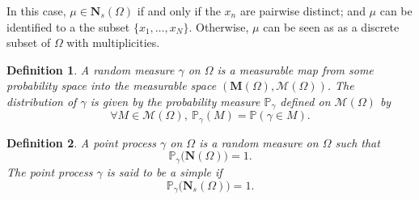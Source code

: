 \documentclass[twoside,11pt]{book}
\newtheorem{definition}{Definition}
\numberwithin{theorem}{chapter}
\numberwithin{definition}{chapter}
\numberwithin{proposition}{chapter}
\numberwithin{corollary}{chapter}
\numberwithin{example}{chapter}
\numberwithin{lemma}{chapter}
\begin{document}
In this case, $\mu \in \mathbf{N}_s(\Omega)$ if and only if the $x_{n}$ are pairwise distinct; and $\mu$ can be identified to a the subset $\{x_{1}, \dots, x_{N}\}$. Otherwise, $\mu$ can be seen as as a discrete subset of $\Omega$ with multiplicities.




\begin{definition}
A random measure $\gamma$ on $\Omega$ is a measurable map from some probability space into the measurable space $(\mathbf{M}(\Omega), \mathcal{M}(\Omega))$. The distribution of $\gamma$ is given by the probability measure $\mathbb{P}_{\gamma}$ defined on $\mathcal{M}(\Omega)$ by
\begin{equation}
\forall M \in \mathcal{M}(\Omega), \:\mathbb{P}_{\gamma}(M) = \mathbb{P}(\gamma \in M).
\end{equation}

\end{definition}

\begin{definition}
A point process $\gamma$ on $\Omega$ is a random measure on $\Omega$ such that
\begin{equation}
\mathbb{P}_{\gamma} \big(\mathbf{N} (\Omega ) \big) = 1.
\end{equation}
The point process $\gamma$ is said to be a simple if 
\begin{equation}
\mathbb{P}_{\gamma}\big(\mathbf{N}_{s}(\Omega)\big) = 1.
\end{equation}

\end{definition}
\end{document}
